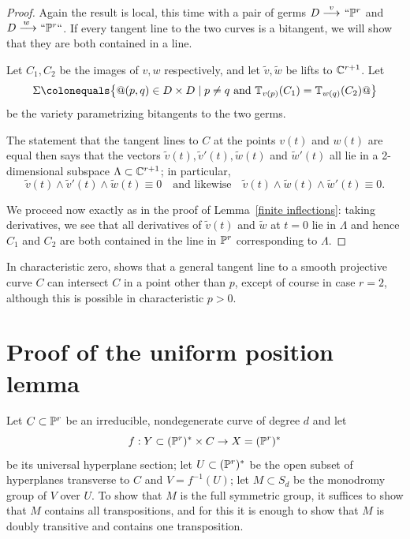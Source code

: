  \begin{proof} Again the result is local, this time with a pair of germs
 $D\ruto {\ v} ` `\PP^r$ and $D\ruto {\,w} ` `\PP^r` `$. If every
 tangent line to the two curves is a bitangent, we will show that they
 are both contained in a line.

  Let $C_1, C_2$ be the images of $v,w$ respectively, and let $\tilde v,
  \tilde w$ be lifts to ${\mathbb C}^{r+1}$.
 Let
 $$
 \Sigma \colonequals  \bigl\{@ (p,q) \in D \times D \mid p\neq q \text{ and
 }\TT_{v(p)}(C_1) = \TT_{w(q)}(C_2)@ \bigr\}
 $$
 be the variety parametrizing bitangents to the two germs.



 The statement that the tangent lines to $C$ at the points $v(t)$
 and $w(t)$ are equal then says that the vectors $\tilde v(t), \tilde
 v'(t),\tilde w(t)$ and $\tilde w'(t)$ all lie in a 2-dimen\-sional subspace
 $\Lambda \subset {\mathbb C}^{r+1}$; in particular,
 $$
 \tilde v(t) \wedge \tilde v'(t) \wedge \tilde w(t) \equiv 0 \quad
 \text{and likewise} \quad \tilde v(t) \wedge \tilde w(t) \wedge \tilde
 w'(t) \equiv 0
.
 $$

We proceed now exactly as in the proof of Lemma~\ref{finite inflections}:
taking derivatives, we see that all derivatives of $\tilde v(t)$
and $\tilde w$ at $t=0$ lie in $\Lambda$
and hence $C_1$ and $C_2$ are both contained in the line in ${\mathbb P}^r$
corresponding to $\Lambda$.
 \end{proof}

In characteristic zero, \cite[Theorem 3.1]{kaji-tangentialDegeneracy}
shows that a general tangent line to a smooth projective curve $C$ can
intersect $C$ in a point other than $p$, except of course in case $r=2$,
although this is possible in characteristic $p>0$.

\section{Proof of the uniform position
lemma
}

Let $C \subset {\mathbb P}^r$ be an irreducible, nondegenerate curve of degree $d$
and
let
$$f : Y \subset ({\mathbb P}^r)^* \times C \to  X = ({\mathbb P}^r)^*$$
be
its universal
hyperplane section; let $U \subset ({\mathbb P}^r)^*$ be the open subset of
hyperplanes transverse to $C$ and $V = f^{-1}(U)$; let $M \subset S_d$
be the monodromy group of $V$ over $U$.
To show that  $M$ is the full symmetric group, it suffices to show that
$M$ contains all transpositions, and for this it is enough to show that
%
$M$ is doubly transitive and contains one transposition.

